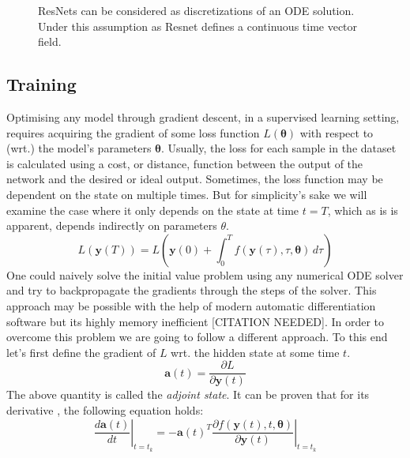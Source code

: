 \documentclass[11pt]{article}
\begin{document}
    \begin{figure}[H]
        \begin{center}
            
        \end{center}
        \caption{ResNets can be considered as discretizations of an ODE solution. Under this assumption as Resnet
        defines a continuous time vector field.}
        \label{fig:resnet_to_node}
    \end{figure}

    \subsection{Training}
    Optimising any model through gradient descent, in a supervised learning setting, requires acquiring the gradient of some loss function $L(\pmb{\theta})$ with respect to (wrt.) the model's parameters $\pmb{\theta}$.
    Usually, the loss for each sample in the dataset is calculated using a cost, or distance, function between the output of the network and the desired or ideal output.
    Sometimes, the loss function may be dependent on the state on multiple times.
    But for simplicity's sake we will examine the case where it only depends on the state at time $t=T$, which as is is apparent, depends indirectly on parameters $\theta$.
    \begin{equation}
        L(\pmb{y}(T)) = L \left( \pmb{y}(0) +\int_{0}^{T} f(\pmb{y}(\tau), \tau, \pmb{\theta}) \,d\tau \right) \label{ode_loss}
    \end{equation}
    One could naively solve the initial value problem using any numerical ODE solver and try to backpropagate the gradients through the steps of the solver.
    This approach may be possible with the help of modern automatic differentiation software but its highly memory inefficient [CITATION NEEDED]. In order to overcome this problem we are going to follow a different approach.
    To this end let's first define the gradient of $L$ wrt.
    the hidden state at some time $t$.
    \begin{equation}
        \pmb a(t) = \frac{\partial L}{\partial \pmb{y}(t) }
    \end{equation}
    The above quantity is called the \textit{adjoint state}.
    It can be proven that for its derivative \cite{pontryagin2018mathematical}, the following equation holds:
    \begin{equation}
        \left.
        \frac
        {d \pmb{a}(t)}
        {dt}
        \right|_{t=t_k}
        =
        - \pmb{a}(t)^T
        \left.
        \frac
        {\partial f( \pmb{y}(t), t, \pmb{\theta} )}
        {\partial \pmb{y}(t) }
        \right|_{t=t_k}
        \label{adjoint}
    \end{equation}
\end{document}
